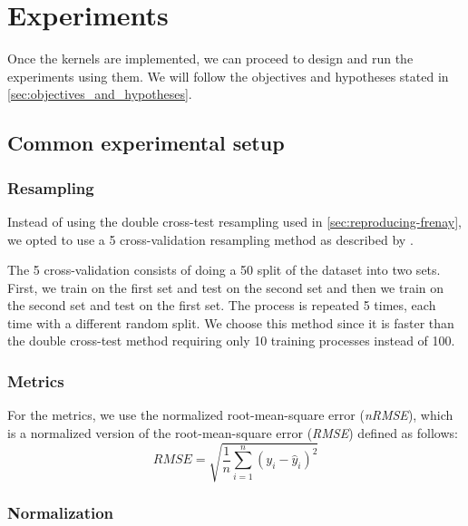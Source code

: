 \chapter{Experiments}
\label{sec:experiments}

Once the kernels are implemented, we can proceed to design and run the
experiments using them. We will follow the objectives and hypotheses stated in
\cref{sec:objectives_and_hypotheses}.

\section{Common experimental setup}

\subsection{Resampling}
\label{sec:resampling}

Instead of using the double cross-test resampling used in
\cref{sec:reproducing-frenay}, we opted to use a 5 cross-validation
resampling method as described by
\textcite{dietterichApproximateStatisticalTests1998}.

The 5 cross-validation consists of doing a 50 split of
the dataset into two sets. First, we train on the first set and test on the
second set and then we train on the second set and test on the first set. The
process is repeated 5 times, each time with a different random split. We choose
this method since it is faster than the double cross-test method requiring only
10 training processes instead of 100.


\subsection{Metrics}
\label{sec:metrics}

For the metrics, we use the normalized root-mean-square error (\emph{nRMSE}),
which is a normalized version of the root-mean-square error (\emph{RMSE})
defined as follows:
\begin{equation}
    RMSE = \sqrt{\frac{1}{n}\sum_{i=1}^n (y_i - \hat{y}_i)^2}
\end{equation}

\subsection{Normalization}

